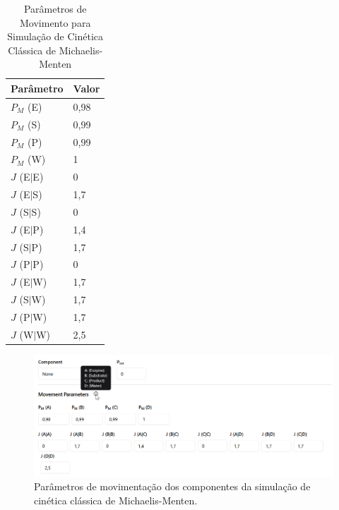 \documentclass[12pt,oneside]{report}
\begin{document}
\begin{table}[H]
    \centering
    \caption{Parâmetros de Movimento para Simulação de Cinética Clássica de Michaelis-Menten}
    \vspace{0.2cm}
    \begin{tabularx}{\textwidth}{X m{5cm}}
        \hline
        \textbf{Parâmetro} & \textbf{Valor} \\
        \hline
        $P_M$ (E)          & 0{,}98         \\
        $P_M$ (S)          & 0{,}99         \\
        $P_M$ (P)          & 0{,}99         \\
        $P_M$ (W)          & 1              \\
        $J$ (E$|$E)        & 0              \\
        $J$ (E$|$S)        & 1{,}7          \\
        $J$ (S$|$S)        & 0              \\
        $J$ (E$|$P)        & 1{,}4          \\
        $J$ (S$|$P)        & 1{,}7          \\
        $J$ (P$|$P)        & 0              \\
        $J$ (E$|$W)        & 1{,}7          \\
        $J$ (S$|$W)        & 1{,}7          \\
        $J$ (P$|$W)        & 1{,}7          \\
        $J$ (W$|$W)        & 2{,}5          \\
        \hline
    \end{tabularx}
    \vspace{0.2cm}
    \label{tab:params_movimento}
\end{table}

\begin{figure}[H]
    \centering
    \includegraphics[width=1\textwidth]{img/movement_MM_S0.png}
    \caption{\small Parâmetros de movimentação dos componentes da simulação de cinética clássica de Michaelis-Menten.}
    \label{fig:michaelis_menten_movement}
\end{figure}
\end{document}
